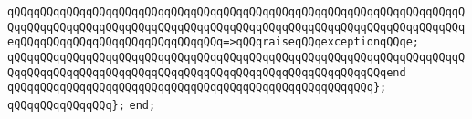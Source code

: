 \verb|qQQqqQQqqQQqqQQqqQQqqQQqqQQqqQQqqQQqqQQqqQQqqQQqqQQqqQQqqQQqqQQqqQQqqQQqqQQqqQQqqQQqqQQqqQQqqQQqqQQqqQQqqQQqqQQqqQQqqQQqqQQqqQQqqQQqqQQqqQQqeqQQqqQQqqQQqqQQqqQQqqQQqqQQqqQQq=>qQQqraiseqQQqexceptionqQQqe;|\newline
\verb|qQQqqQQqqQQqqQQqqQQqqQQqqQQqqQQqqQQqqQQqqQQqqQQqqQQqqQQqqQQqqQQqqQQqqQQqqQQqqQQqqQQqqQQqqQQqqQQqqQQqqQQqqQQqqQQqqQQqqQQqqQQqqQQqend|\newline
\verb|qQQqqQQqqQQqqQQqqQQqqQQqqQQqqQQqqQQqqQQqqQQqqQQqqQQqqQQq};|\newline
\verb|qQQqqQQqqQQqqQQq};|\newline
\verb|end;|\newline
\newline


